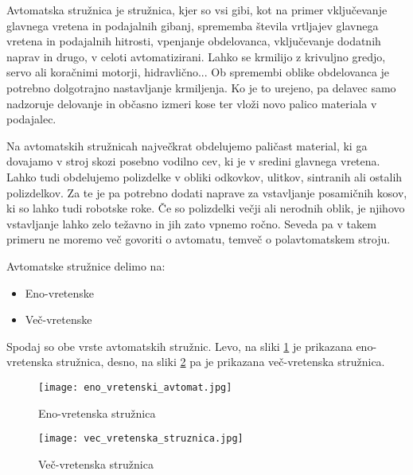 Avtomatska stružnica je stružnica, kjer so vsi
gibi, kot na primer vključevanje glavnega vretena
in podajalnih gibanj, sprememba števila vrtljajev
glavnega vretena in podajalnih hitrosti, vpenjanje
obdelovanca, vključevanje dodatnih naprav in drugo,
v celoti avtomatizirani. Lahko se krmilijo z krivuljno gredjo,
servo ali koračnimi motorji, hidravlično... Ob spremembi oblike
obdelovanca je potrebno dolgotrajno nastavljanje krmiljenja.
Ko je to urejeno, pa delavec samo nadzoruje delovanje
in občasno izmeri kose ter vloži novo palico materiala
v podajalec.

Na avtomatskih stružnicah največkrat obdelujemo paličast
material, ki ga dovajamo v stroj skozi posebno vodilno
cev, ki je v sredini glavnega vretena. Lahko tudi obdelujemo
polizdelke v obliki odkovkov, ulitkov, sintranih ali ostalih polizdelkov.
Za te je pa potrebno dodati naprave za vstavljanje posamičnih kosov,
ki so lahko tudi robotske roke.
Če so polizdelki večji ali
nerodnih oblik, je njihovo vstavljanje lahko zelo težavno
in jih zato vpnemo ročno. Seveda pa v takem primeru
ne moremo več govoriti o avtomatu, temveč o
polavtomatskem stroju.

\noindent Avtomatske stružnice delimo na:
\begin{itemize}
	\item Eno-vretenske
	\item Več-vretenske
\end{itemize}

Spodaj so obe vrste avtomatskih stružnic. Levo, na sliki \ref{eno_vretenska_struznica}
je prikazana eno-vretenska stružnica, desno, na sliki \ref{vec_vretenska_struznica}
pa je prikazana več-vretenska stružnica.

\begin{multicols}{2}
	\begin{figure}[H]
		\texttt{[image: eno\_vretenski\_avtomat.jpg]}
		\caption{Eno-vretenska stružnica
			\cite{eno_vretenska_struznica}}
		\label{eno_vretenska_struznica}
	\end{figure}

	\columnbreak

	\begin{figure}[H]
		\texttt{[image: vec\_vretenska\_struznica.jpg]}
		\caption{Več-vretenska stružnica
			\cite{vec_vretenska_struznica}}
		\label{vec_vretenska_struznica}
	\end{figure}
\end{multicols}
